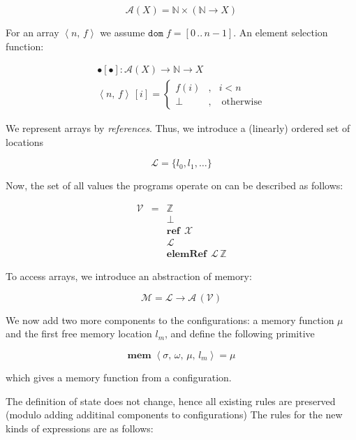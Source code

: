 \documentclass{article}
\newcommand{\inbr}[1]{\left<{#1}\right>}
\newcommand{\dom}[1]{\mathtt{dom}\;{#1}}
\newcommand{\primi}[2]{\mathbf{#1}\;{#2}}
\theoremstyle{definition}
\begin{document}
\[
\mathscr A(X) = \mathbb N \times (\mathbb N \to X)
\]

For an array $\inbr{n,\, f}$ we assume $\dom{f}=[0\,..\,n-1]$. An element selection function:

\[
\begin{array}{c}
  \bullet[\bullet] : \mathscr A (X) \to \mathbb N \to X\\[2mm]
  \inbr{n,\, f}\, [i] = \left\{
                  \begin{array}{rcl}
                     f (i) &, & i < n\\
                     \bot&,&\;\mbox{otherwise}
                  \end{array}
               \right.
\end{array}
\]

We represent arrays by \emph{references}. Thus, we introduce a (linearly) ordered set of locations

\[
\mathscr L = \{l_0, l_1, \dots\}
\]

Now, the set of all values the programs operate on can be described as follows:

\[
\begin{array}{rcl}
  \mathscr V & = & \mathbb Z \\
             &   & \bot \\
             &   & \primi{ref}\,\mathscr X\\
             &   & \mathscr L\\
             &   & \primi{elemRef}\,\mathscr L\,\mathbb Z
\end{array}
\]

To access arrays, we introduce an abstraction of memory:

\[
    \mathscr M = \mathscr L \to \mathscr A\,(\mathscr V)
\]

We now add two more components to the configurations: a memory function $\mu$ and the first free memory location $l_m$, and
define the following primitive

\[
\primi{mem}{\inbr{\sigma,\,\omega,\,\mu,\,l_m}}=\mu
\]

which gives a memory function from a configuration.

The definition of state does not change, hence all existing rules are preserved (modulo adding additinal components to configurations)
The rules for the new kinds of expressions are as follows:
\end{document}
